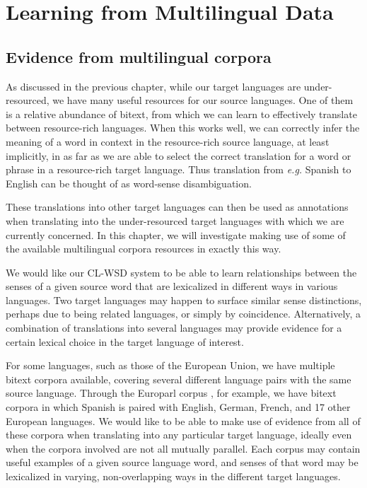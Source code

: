 \chapter{Learning from Multilingual Data}
\label{chap:multilingual}

\section{Evidence from multilingual corpora}
As discussed in the previous chapter, while our target languages are
under-resourced, we have many useful resources for our source languages. One of
them is a relative abundance of bitext, from which we can learn to effectively
translate between resource-rich languages. When this works well, we can
correctly infer the meaning of a word in context in the resource-rich source
language, at least implicitly, in as far as we are able to select the correct
translation for a word or phrase in a resource-rich target language.
Thus translation from \emph{e.g.} Spanish to English can be thought of as
word-sense disambiguation.

These translations into other target languages can then be used as annotations
when translating into the under-resourced target languages with which we are
currently concerned. In this chapter, we will investigate making use of some of
the available multilingual corpora resources in exactly this way.

We would like our CL-WSD system to be able to learn relationships between the
senses of a given source word that are lexicalized in different ways in various
languages.
Two target languages may happen to surface similar sense distinctions, perhaps
due to being related languages, or simply by coincidence. Alternatively, a
combination of translations into several languages may provide evidence for a
certain lexical choice in the target language of interest.

For some languages, such as those of the European Union, we have multiple
bitext corpora available, covering several different language pairs with the
same source language. Through the Europarl corpus \cite{europarl}, for example,
we have bitext corpora in which Spanish is paired with English, German, French,
and 17 other European languages.
We would like to be able to make use of evidence from all of these corpora when
translating into any particular target language, ideally even when the corpora
involved are not all mutually parallel.
Each corpus may contain useful examples of a given source language word,
and senses of that word may be lexicalized in varying, non-overlapping ways in
the different target languages.

